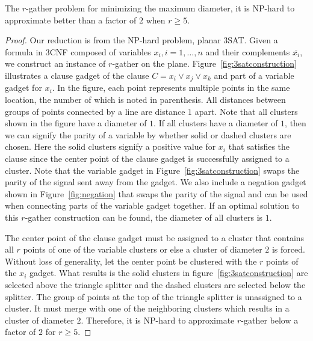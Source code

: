 \begin{theorem}\label{thm:hardness1}
The $r$-gather problem for minimizing the maximum diameter, it is NP-hard to approximate better than a factor of $2$ when $r\geq5$.
\end{theorem}
\begin{proof}
Our reduction is from the NP-hard problem, planar 3SAT.  Given a formula in 3CNF composed of variables $x_i, i = 1,\dots,n$ and their complements $\overline{x_i}$, we construct an instance of $r$-gather on the plane.  Figure~\ref{fig:3satconstruction} illustrates a clause gadget of the clause $C = x_i \vee x_j \vee x_k$ and part of a variable gadget for $x_i$.  In the figure, each point represents multiple points in the same location, the number of which is noted in parenthesis.  All distances between groups of points connected by a line are distance $1$ apart.  Note that all clusters shown in the figure have a diameter of $1$.  If all clusters have a diameter of $1$, then we can signify the parity of a variable by whether solid or dashed clusters are chosen.  Here the solid clusters signify a positive value for $x_i$ that satisfies the clause since the center point of the clause gadget is successfully assigned to a cluster.  Note that the variable gadget in Figure~\ref{fig:3satconstruction} swaps the parity of the signal sent away from the gadget.  We also include a negation gadget shown in Figure~\ref{fig:negation} that swaps the parity of the signal and can be used when connecting parts of the variable gadget together.  If an optimal solution to this $r$-gather construction can be found, the diameter of all clusters is $1$.


The center point of the clause gadget must be assigned to a cluster that contains all $r$ points of one of the variable clusters or else a cluster of diameter $2$ is forced.  Without loss of generality, let the center point be clustered with the $r$ points of the $x_i$ gadget.  What results is the solid clusters in figure~\ref{fig:3satconstruction} are selected above the triangle splitter and the dashed clusters are selected below the splitter.  The group of points at the top of the triangle splitter is unassigned to a cluster.  It must merge with one of the neighboring clusters which results in a cluster of diameter $2$.  Therefore, it is NP-hard to approximate $r$-gather below a factor of $2$ for $r\geq5$.
\end{proof}

